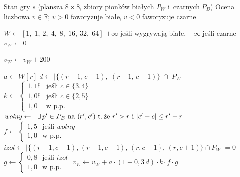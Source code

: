 \documentclass[12pt,a4paper]{article}
\begin{document}
\begin{algorithm}[H]
\caption{Funkcja ewaluacji pozycji w~Breakthrough}\label{alg:eval}
\begin{algorithmic}[1]

\Require Stan gry $s$ (plansza $8\times8$, zbiory pionków białych $P_W$ i~czarnych $P_B$)
\Ensure  Ocena liczbowa $v \in \mathbb{R}$;\; $v > 0$ faworyzuje białe, $v < 0$ faworyzuje czarne

\State $W \gets [1,\; 1,\; 2,\; 4,\; 8,\; 16,\; 32,\; 64]$
    \Return $+\infty$ jeśli wygrywają białe, $-\infty$ jeśli czarne
\EndIf
\State $v_W \gets 0$

\Statex
{}
        \State $v_W \gets v_W + 200$
    \EndIf
\EndFor

\Statex
{}
    \State $a \gets W[r]$
    \State $d \gets \bigl|\{(r\!-\!1,\, c\!-\!1),\;(r\!-\!1,\, c\!+\!1)\} \;\cap\; P_W\bigr|$
    \State $k \gets \begin{cases} 1{,}15 & \text{jeśli } c \in \{3,4\} \\ 1{,}05 & \text{jeśli } c \in \{2,5\} \\ 1{,}0 & \text{w~p.p.} \end{cases}$
    \State $\mathit{wolny} \gets \lnot\exists\, p' \in P_B \text{ na } (r', c') \text{ t.\,że } r' > r \text{ i } |c' - c| \leq r' - r$
    \State $f \gets \begin{cases} 1{,}5 & \text{jeśli } \mathit{wolny} \\ 1{,}0 & \text{w~p.p.} \end{cases}$
    \State $\mathit{izol} \gets \bigl|\{(r\!-\!1,c\!-\!1),\,(r\!-\!1,c\!+\!1),\,(r,c\!-\!1),\,(r,c\!+\!1)\} \cap P_W\bigr| = 0$
    \State $g \gets \begin{cases} 0{,}8 & \text{jeśli } \mathit{izol} \\ 1{,}0 & \text{w~p.p.} \end{cases}$
    \State $v_W \gets v_W + a \cdot (1 + 0{,}3\, d) \cdot k \cdot f \cdot g$
\EndFor


\end{algorithmic}
\end{algorithm}
\end{document}
